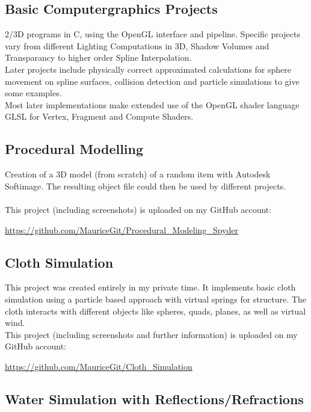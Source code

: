 \documentclass[a4paper, 12pt]{article}
\begin{document}
\subsection{Basic Computergraphics Projects}

2/3D programs in C, using the OpenGL interface and pipeline. Specific projects vary from different Lighting Computations
in 3D, Shadow Volumes and Transparancy to higher order Spline Interpolation.
\\
Later projects include physically correct approximated calculations for sphere movement on spline surfaces, collision 
detection and particle simulations to give some examples.
\\
Most later implementations make extended use of the OpenGL shader language GLSL for Vertex, Fragment and
Compute Shaders.

\subsection{Procedural Modelling}

Creation of a 3D model (from scratch) of a random item with Autodesk Softimage.
The resulting object file could then be used by different projects.
\\
\\
This project (including screenshots) is uploaded on my GitHub account:

\begin{center}
	\url{https://github.com/MauriceGit/Procedural_Modeling_Spyder}
\end{center}

\subsection{Cloth Simulation}

This project was created entirely in my private time. It implements basic cloth simulation using a particle 
based approach with virtual springs for structure. The cloth interacts with different objects like spheres,
quads, planes, as well as virtual wind. 
\\
This project (including screenshots and further information) is uploaded on my GitHub account:

\begin{center}
	\url{https://github.com/MauriceGit/Cloth_Simulation}
\end{center}

\subsection{Water Simulation with  Reflections/Refractions}\label{subsec:water}
\end{document}
